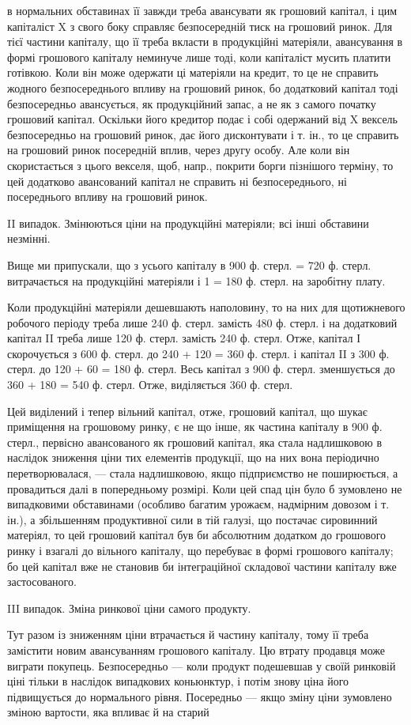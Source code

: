 \parcont{}  %
в нормальних обставинах її завжди треба авансувати як грошовий капітал,
і цим капіталіст X з свого боку справляє безпосередній тиск на грошовий
ринок. Для тієї частини капіталу, що її треба вкласти в продукційні
матеріяли, авансування в формі грошового капіталу неминуче лише
тоді, коли капіталіст мусить платити готівкою. Коли він може одержати
ці матеріяли на кредит, то це не справить жодного безпосереднього
впливу на грошовий ринок, бо додатковий капітал тоді безпосередньо
авансується, як продукційний запас, а не як з самого початку грошовий
капітал. Оскільки його кредитор подає і собі одержаний від X вексель
безпосередньо на грошовий ринок, дає його дисконтувати і т. ін., то це
справить на грошовий ринок посередній вплив, через другу особу. Але
коли він скористається з цього векселя, щоб, напр., покрити борги пізнішого
терміну, то цей додатково авансований капітал не справить ні
безпосереднього, ні посереднього впливу на грошовий ринок.

II випадок. Змінюються ціни на продукційні матеріяли; всі інші
обставини незмінні.

Вище ми припускали, що з усього капіталу в 900 ф. стерл.  = 720 ф.
стерл. витрачається на продукційні матеріяли і 1 = 180 ф. стерл. на заробітну
плату.

Коли продукційні матеріяли дешевшають наполовину, то на них для
щотижневого робочого періоду треба лише 240 ф. стерл. замість 480 ф.
стерл. і на додатковий капітал II треба лише 120 ф. стерл. замість
240 ф. стерл. Отже, капітал І скорочується з 600 ф. стерл. до 240 +
120 = 360 ф. стерл. і капітал II з 300 ф. стерл. до 120 + 60 = 180 ф.
стерл. Весь капітал з 900 ф. стерл. зменшується до 360 + 180 = 540 ф.
стерл. Отже, виділяється 360 ф. стерл.

Цей виділений і тепер вільний капітал, отже, грошовий капітал, що
шукає приміщення на грошовому ринку, є не що інше, як частина капіталу
в 900 ф. стерл., первісно авансованого як грошовий капітал, яка
стала надлишковою в наслідок зниження ціни тих елементів продукції,
що на них вона періодично перетворювалася, — стала надлишковою,
якщо підприємство не поширюється, а провадиться далі в попередньому
розмірі. Коли цей спад цін було б зумовлено не випадковими обставинами
(особливо багатим урожаєм, надмірним довозом і т. ін.), а збільшенням
продуктивної сили в тій галузі, що постачає сировинний матеріял,
то цей грошовий капітал був би абсолютним додатком до грошового
ринку і взагалі до вільного капіталу, що перебуває в формі грошового
капіталу; бо цей капітал вже не становив би інтеграційної складової частини
капіталу вже застосованого.

III випадок. Зміна ринкової ціни самого продукту.

Тут разом із зниженням ціни втрачається й частину капіталу, тому її
треба замістити новим авансуванням грошового капіталу. Цю втрату
продавця може виграти покупець. Безпосередньо — коли продукт подешевшав
у своїй ринковій ціні тільки в наслідок випадкових коньюнктур,
і потім знову ціна його підвищується до нормального рівня. Посередньо —
якщо зміну ціни зумовлено зміною вартости, яка впливає й на старий
\parbreak{}  %
